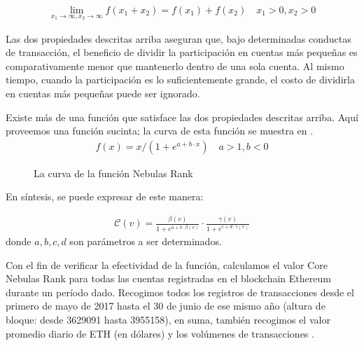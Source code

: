 \begin{align}
\lim\limits_{x_1 \to \infty, x_2\to \infty} f(x_1+x_2) = f(x_1) + f(x_2)\quad x_1>0, x_2>0
\end{align}

Las dos propiedades descritas arriba aseguran que, bajo determinadas conductas de transacción, el beneficio de dividir la participación en cuentas más pequeñas es comparativamente menor que mantenerlo dentro de una sola cuenta. Al mismo tiempo, cuando la participación es lo suficientemente grande, el costo de dividirla en cuentas más pequeñas puede ser ignorado.

Existe más de una función que satisface las dos propiedades descritas arriba. Aquí proveemos una función sucinta; la curva de esta función se muestra en .
\begin{align}
f(x) = x/(1 + e^{a + b\cdot x}) \quad a>1,b<0
\end{align}

\begin{figure}
\centering
{}
\caption{La curva de la función Nebulas Rank \label{fig-nr}}
\end{figure}


\vspace{2em}
En síntesis,  se puede expresar de este manera:

\begin{align}
\label{eq:rank-param}
\mathcal{C}(v) =  \frac{\beta(v)}{1+e^{a + b \cdot \beta(v)}} \cdot \frac{\gamma(v)}{1+e^{c + d \cdot \gamma(v)}}
\end{align}
\noindent donde $a, b, c, d$ son parámetros a ser determinados.


Con el fin de verificar la efectividad de la función, calculamos el valor Core Nebulas Rank para todas las cuentas registradas en el blockchain Ethereum durante un período dado. Recogimos todos los registros de transacciones desde el primero de mayo de 2017 hasta el 30 de junio de ese mismo año (altura de bloque: desde 3629091 hasta 3955158), en suma, también recogimos el valor promedio diario de ETH (en dólares) y los volúmenes de transacciones \cite{coinmarketcap}.


